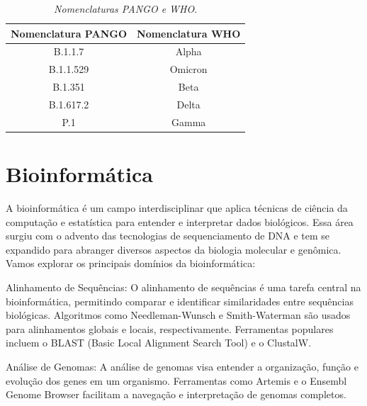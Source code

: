 \begin{table}[htb]
  \caption{\textit{Nomenclaturas PANGO e WHO}.}
  \begin{center}
    \begin{tabular}{c|c}
      \hline
      Nomenclatura PANGO & Nomenclatura WHO \\
      \hline
      B.1.1.7            & Alpha            \\
      B.1.1.529          & Omicron          \\
      B.1.351            & Beta             \\
      B.1.617.2          & Delta            \\
      P.1                & Gamma            \\
      \hline
    \end{tabular}
  \end{center}
  \label{tab:nomenclaturaPangoWho}
\end{table}

\section{Bioinformática}
A bioinformática é um campo interdisciplinar que aplica técnicas de ciência da computação e estatística para entender e interpretar dados biológicos. Essa área surgiu com o advento das tecnologias de sequenciamento de DNA e tem se expandido para abranger diversos aspectos da biologia molecular e genômica. Vamos explorar os principais domínios da bioinformática:

Alinhamento de Sequências:
O alinhamento de sequências é uma tarefa central na bioinformática, permitindo comparar e identificar similaridades entre sequências biológicas. Algoritmos como Needleman-Wunsch e Smith-Waterman são usados para alinhamentos globais e locais, respectivamente. Ferramentas populares incluem o BLAST (Basic Local Alignment Search Tool) e o ClustalW.

Análise de Genomas:
A análise de genomas visa entender a organização, função e evolução dos genes em um organismo. Ferramentas como Artemis e o Ensembl Genome Browser facilitam a navegação e interpretação de genomas completos.

